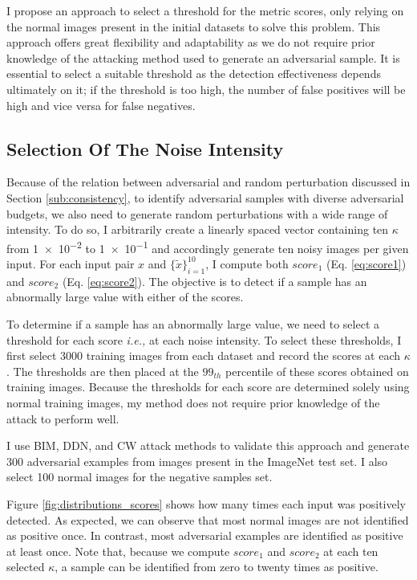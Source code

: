 I propose an approach to select a threshold for the metric scores, only relying
on the normal images present in the initial datasets to solve this problem. This
approach offers great flexibility and adaptability as we do not require prior
knowledge of the attacking method used to generate an adversarial sample. It is
essential to select a suitable threshold as the detection effectiveness depends
ultimately on it; if the threshold is too high, the number of false positives
will be high and vice versa for false negatives.

\subsection{Selection Of The Noise Intensity}
\label{sec:selection_of_the_intensity}

Because of the relation between adversarial and random perturbation discussed in
Section \ref{sub:consistency}, to identify adversarial samples with diverse
adversarial budgets, we also need to generate random perturbations with a wide
range of intensity. To do so, I arbitrarily create a linearly spaced vector
containing ten $\kappa$ from \num{1e-2} to \num{1e-1} and accordingly generate
ten noisy images per given input. For each input pair $x$ and
$\{\tilde{x}\}_{i=1}^{10}$, I compute both $score_1$ (Eq. \ref{eq:score1}) and
$score_2$ (Eq. \ref{eq:score2}). The objective is to detect if a sample has an
abnormally large value with either of the scores.

To determine if a sample has an abnormally large value, we need to select a
threshold for each score \emph{i.e.,} at each noise intensity. To select these
thresholds, I first select 3000 training images from each dataset and record the
scores at each $\kappa$. The thresholds are then placed at the $99_{th}$ percentile
of these scores obtained on training images. Because the thresholds for each
score are determined solely using normal training images, my method does not
require prior knowledge of the attack to perform well.

I use BIM, DDN, and CW attack methods to validate this approach and generate 300
adversarial examples from images present in the ImageNet test set. I also select
100 normal images for the negative samples set.

Figure \ref{fig:distributions_scores} shows how many times each input was
positively detected. As expected, we can observe that most normal images are not
identified as positive once. In contrast, most adversarial examples are
identified as positive at least once. Note that, because we compute $score_1$
and $score_2$ at each ten selected $\kappa$, a sample can be identified from
zero to twenty times as positive.

